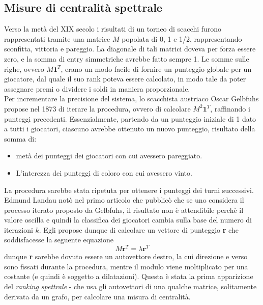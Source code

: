 \subsection{Misure di centralità spettrale}
Verso la metà del XIX secolo i risultati di un torneo di scacchi furono rappresentati tramite una matrice $M$ popolata di 0, 1 e 1/2, rappresentando sconfitta, vittoria e pareggio. La diagonale di tali matrici doveva per forza essere zero, e la somma di entry simmetriche avrebbe fatto sempre 1. Le somme sulle righe, ovvero $M\textbf{1}^T$, erano un modo facile di fornire un punteggio globale per un giocatore, dal quale il suo rank poteva essere calcolato, in modo tale da poter assegnare premi o dividere i soldi in maniera proporzionale.\\
Per incrementare la precisione del sistema, lo scacchista austriaco Oscar Gelbfuhs propose nel 1873 di iterare la procedura, ovvero di calcolare $M^2\textbf{1}^T$, raffinando i punteggi precedenti. Essenzialmente, partendo da un punteggio iniziale di 1 dato a tutti i giocatori, ciascuno avrebbe ottenuto un nuovo punteggio, risultato della somma di:
\begin{itemize}
    \item metà dei punteggi dei giocatori con cui avessero pareggiato.
    \item L'interezza dei punteggi di coloro con cui avessero vinto.
\end{itemize}
La procedura sarebbe stata ripetuta per ottenere i punteggi dei turni successivi.\\
Edmund Landau %
notò nel primo articolo che pubblicò %
che se uno considera il processo iterato proposto da Gelbfuhs, il risultato non è attendibile perchè il valore oscilla e quindi la classifica dei giocatori cambia sulla base del numero di iterazioni $k$. Egli propose dunque di calcolare un vettore di punteggio \textbf{r} che soddisfacesse la seguente equazione
\begin{equation}
    M\textbf{r}^T = \lambda \textbf{r}^T
\end{equation}
dunque \textbf{r} sarebbe dovuto essere un autovettore destro, la cui direzione e verso sono fissati durante la procedura, mentre il modulo viene moltiplicato per una costante (e quindi è soggetto a dilatazioni). Questa è stata la prima apparizione del \textit{ranking spettrale} - che usa gli autovettori di una qualche matrice, solitamente derivata da un grafo, per calcolare una misura di centralità.
